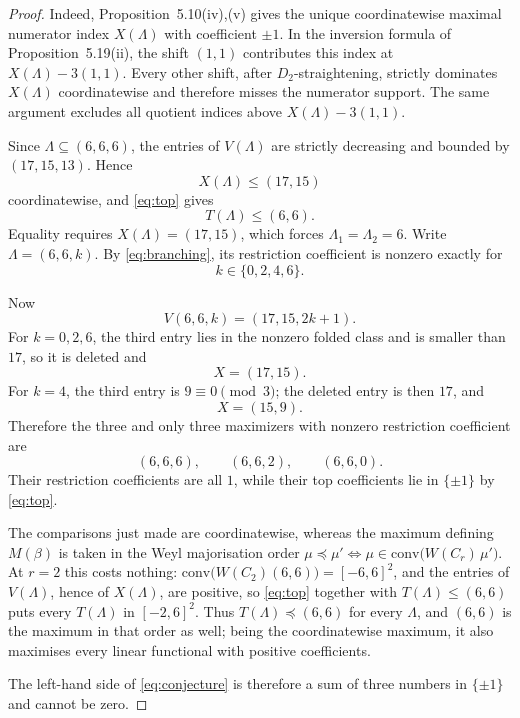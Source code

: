 \documentclass[11pt]{amsart}
\theoremstyle{remark}
\begin{document}
\begin{proof}
Indeed, Proposition~5.10(iv),(v) gives the unique coordinatewise
maximal numerator index $X(\Lambda)$ with coefficient $\pm1$. In the
inversion formula of Proposition~5.19(ii), the shift $(1,1)$ contributes
this index at $X(\Lambda)-3(1,1)$. Every other shift, after
$D_2$-straightening, strictly dominates $X(\Lambda)$ coordinatewise
and therefore misses the numerator support. The same argument excludes
all quotient indices above $X(\Lambda)-3(1,1)$.

Since $\Lambda\subseteq(6,6,6)$, the entries of $V(\Lambda)$ are
strictly decreasing and bounded by $(17,15,13)$. Hence
\[
X(\Lambda)\le(17,15)
\]
coordinatewise, and \eqref{eq:top} gives
\[
T(\Lambda)\le(6,6).
\]
Equality requires $X(\Lambda)=(17,15)$, which forces
$\Lambda_1=\Lambda_2=6$. Write $\Lambda=(6,6,k)$. By
\eqref{eq:branching}, its restriction coefficient is nonzero exactly
for
\[
k\in\{0,2,4,6\}.
\]

Now
\[
V(6,6,k)=(17,15,2k+1).
\]
For $k=0,2,6$, the third entry lies in the nonzero folded class and
is smaller than $17$, so it is deleted and
\[
X=(17,15).
\]
For $k=4$, the third entry is $9\equiv0\pmod3$; the deleted entry is
then $17$, and
\[
X=(15,9).
\]
Therefore the three and only three maximizers with nonzero restriction
coefficient are
\[
(6,6,6),\qquad (6,6,2),\qquad (6,6,0).
\]
Their restriction coefficients are all $1$, while their top
coefficients lie in $\{\pm1\}$ by \eqref{eq:top}.

The comparisons just made are coordinatewise, whereas the maximum defining
$M(\beta)$ is taken in the Weyl majorisation order
$\mu\preceq\mu'\iff\mu\in\mathrm{conv}\bigl(W(C_r)\,\mu'\bigr)$. At $r=2$
this costs nothing: $\mathrm{conv}\bigl(W(C_2)(6,6)\bigr)=[-6,6]^2$, and the
entries of $V(\Lambda)$, hence of $X(\Lambda)$, are positive, so
\eqref{eq:top} together with $T(\Lambda)\le(6,6)$ puts every $T(\Lambda)$
in $[-2,6]^2$. Thus
$T(\Lambda)\preceq(6,6)$ for every $\Lambda$, and $(6,6)$ is the maximum in
that order as well; being the coordinatewise maximum, it also maximises
every linear functional with positive coefficients.

The left-hand side of \eqref{eq:conjecture} is therefore a sum of three
numbers in $\{\pm1\}$ and cannot be zero.
\end{proof}
\end{document}
